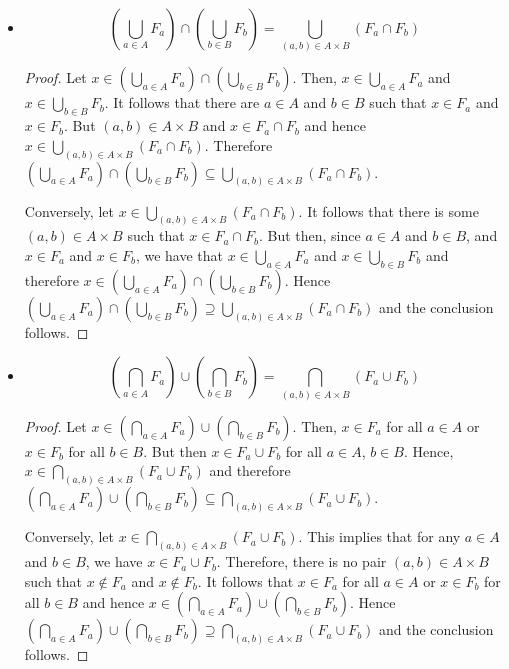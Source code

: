 \begin{itemize}
    \item $$(\bigcup_{a \in A} F_a) \cap (\bigcup_{b \in B} F_b) = \bigcup_{(a,b) \in A \times B} (F_a \cap F_b)$$
    
    \begin{proof}
        Let $x \in (\bigcup_{a \in A} F_a) \cap (\bigcup_{b \in B} F_b)$. Then, $x \in \bigcup_{a \in A} F_a$ and $x \in \bigcup_{b \in B} F_b$. It follows that there are $a \in A$ and $b \in B$ such that $x \in F_a$ and $x \in F_b$. But $(a,b) \in A \times B$ and $x \in F_a \cap F_b$ and hence $x \in \bigcup_{(a,b) \in A \times B} (F_a \cap F_b)$. Therefore $(\bigcup_{a \in A} F_a) \cap (\bigcup_{b \in B} F_b) \subseteq \bigcup_{(a,b) \in A \times B} (F_a \cap F_b)$.
        
        Conversely, let $x \in \bigcup_{(a,b) \in A \times B} (F_a \cap F_b)$. It follows that there is some $(a,b) \in A \times B$ such that $x \in F_a \cap F_b$. But then, since $a \in A$ and $b \in B$, and $x \in F_a$ and $x \in F_b$, we have that $x\in \bigcup_{a \in A} F_a$ and $x \in \bigcup_{b \in B} F_b$ and therefore $x \in (\bigcup_{a \in A} F_a) \cap (\bigcup_{b \in B} F_b)$. Hence $(\bigcup_{a \in A} F_a) \cap (\bigcup_{b \in B} F_b) \supseteq \bigcup_{(a,b) \in A \times B} (F_a \cap F_b)$ and the conclusion follows.
    \end{proof}
    
    \item $$(\bigcap_{a \in A} F_a) \cup (\bigcap_{b \in B} F_b) = \bigcap_{(a,b) \in A \times B} (F_a \cup F_b)$$
    
    \begin{proof}
        Let $x \in (\bigcap_{a \in A} F_a) \cup (\bigcap_{b \in B} F_b)$. Then, $x \in F_a$ for all $a \in A$ or $x \in F_b$ for all $b \in B$. But then $x \in F_a \cup F_b$ for all $a \in A$, $b \in B$. Hence, $x \in \bigcap_{(a,b) \in A \times B} (F_a \cup F_b)$ and therefore $(\bigcap_{a \in A} F_a) \cup (\bigcap_{b \in B} F_b) \subseteq \bigcap_{(a,b) \in A \times B} (F_a \cup F_b)$.
        
        Conversely, let $x \in \bigcap_{(a,b) \in A \times B} (F_a \cup F_b)$. This implies that for any $a \in A$ and $b \in B$, we have $x \in F_a \cup F_b$. Therefore, there is no pair $(a,b) \in A \times B$ such that $x \notin F_a$ and $x \notin F_b$. It follows that $x \in F_a$ for all $a \in A$ or $x \in F_b$ for all $b \in B$ and hence $x \in (\bigcap_{a \in A} F_a) \cup (\bigcap_{b \in B} F_b)$. Hence $(\bigcap_{a \in A} F_a) \cup (\bigcap_{b \in B} F_b) \supseteq \bigcap_{(a,b) \in A \times B} (F_a \cup F_b)$ and the conclusion follows.
    \end{proof}
\end{itemize}


